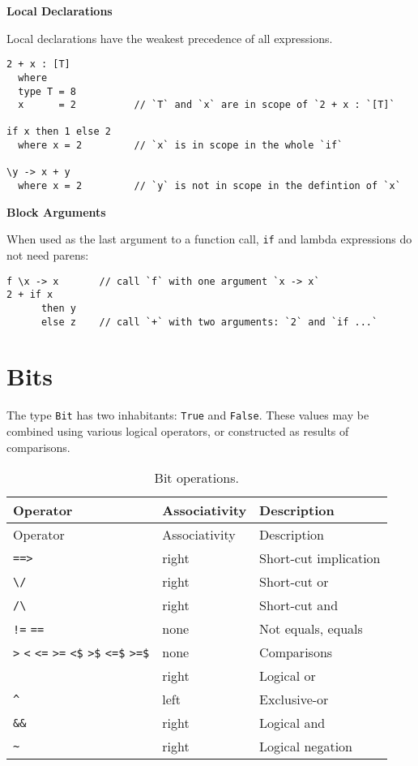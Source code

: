 \textbf{Local Declarations}

Local declarations have the weakest precedence of all expressions.

\begin{verbatim}
2 + x : [T]
  where
  type T = 8
  x      = 2          // `T` and `x` are in scope of `2 + x : `[T]`

if x then 1 else 2
  where x = 2         // `x` is in scope in the whole `if`

\y -> x + y
  where x = 2         // `y` is not in scope in the defintion of `x`
\end{verbatim}

\textbf{Block Arguments}

When used as the last argument to a function call, \texttt{if} and
lambda expressions do not need parens:

\begin{verbatim}
f \x -> x       // call `f` with one argument `x -> x`
2 + if x
      then y
      else z    // call `+` with two arguments: `2` and `if ...`
\end{verbatim}

\hypertarget{bits}{%
\section{Bits}\label{bits}}

The type \texttt{Bit} has two inhabitants: \texttt{True} and
\texttt{False}. These values may be combined using various logical
operators, or constructed as results of comparisons.

\begin{longtable}[]{@{}lll@{}}
\caption{Bit operations.}\tabularnewline
\toprule
Operator & Associativity & Description \\
\midrule
\endfirsthead
\toprule
Operator & Associativity & Description \\
\midrule
\endhead
\texttt{==\textgreater{}} & right & Short-cut implication \\
\texttt{\textbackslash{}/} & right & Short-cut or \\
\texttt{/\textbackslash{}} & right & Short-cut and \\
\texttt{!=} \texttt{==} & none & Not equals, equals \\
\texttt{\textgreater{}} \texttt{\textless{}} \texttt{\textless{}=}
\texttt{\textgreater{}=} \texttt{\textless{}\$}
\texttt{\textgreater{}\$} \texttt{\textless{}=\$}
\texttt{\textgreater{}=\$} & none & Comparisons \\
\texttt{\textbar{}\textbar{}} & right & Logical or \\
\texttt{\^{}} & left & Exclusive-or \\
\texttt{\&\&} & right & Logical and \\
\texttt{\textasciitilde{}} & right & Logical negation \\
\bottomrule
\end{longtable}

